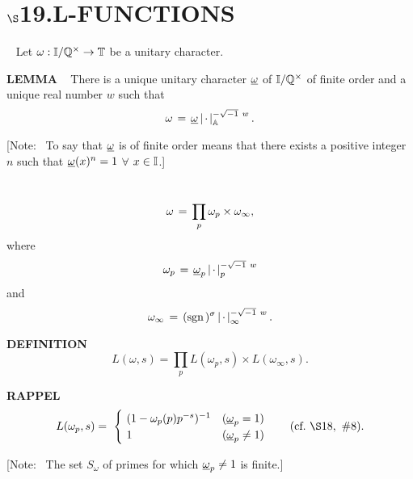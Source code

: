 \chapter{
$\boldsymbol{\S}$\textbf{19}.\quad  L-FUNCTIONS}
\setlength\parindent{2em}
\setcounter{theoremn}{0}

\ \indent 
Let $\omega:\mathbb{I}/\mathbb{Q}^\times \rightarrow \mathbb{T}$ be a unitary character.

\vspace{0.25cm}

\begin{x}{\small\bf LEMMA} \ %
There is a unique unitary character $\underline{\omega}$ of $\mathbb{I}/\mathbb{Q}^\times $ of finite order and a unique real number $w$ such that
\[
\omega \hspace{0.05cm} = \hspace{0.05cm} \underline{\omega}\left\vert\hspace{0.05cm} \cdot \hspace{0.05cm}\right\vert_{\mathbb{A}}^{-\sqrt{-1}\ w}.
\]

[Note: \  To say that $\underline{\omega}$ is of finite order means that there exists a positive integer $n$ such that 
$\underline{\omega}(x)^n = 1$ $\forall$ $x \in \mathbb{I}$.]
\end{x}

\vspace{0.1cm}

\begin{x}{\small\bf {}} \ %
\[
\omega \hspace{0.05cm} =\hspace{0.05cm}  \prod_p \omega_p \times \omega_\infty,
\]
where
\[
\omega_p \hspace{0.05cm} =\hspace{0.05cm}  \underline{\omega}_p \left\vert\hspace{0.05cm} \cdot \hspace{0.05cm}\right\vert_p^{-\sqrt{-1}\ w}
\]
and
\[
\omega_\infty \hspace{0.05cm} =\hspace{0.05cm}  (\text{sgn}\hspace{0.05cm})^\sigma \left\vert\hspace{0.05cm} \cdot \hspace{0.05cm}\right\vert_\infty^{-\sqrt{-1}\ w}.
\]
\end{x}

\vspace{0.1cm}

\begin{x}{\small\bf DEFINITION} \ %
\[
L(\omega,s) = \prod_p L(\omega_p,s) \times L(\omega_\infty,s).
\]
\end{x}

\begin{x}{\small\bf RAPPEL} \ %
\[L(\omega_p,s) =\ 
\begin{cases}
\ (1 - \omega_p(p)p^{-s})^{-1}   \quad (\un{\omega}_p = 1)\\
\ 1  \qquad \qquad\qquad \qquad  (\un{\omega}_p \ne 1)
\end{cases}
\quad (\text{cf.} \ \S18, \ \#8).
\]

\vspace{0.1cm}

[Note: \  The set $S_\omega$ of primes for which $\underline{\omega}_p \ne 1$ is finite.$]$
\end{x}

